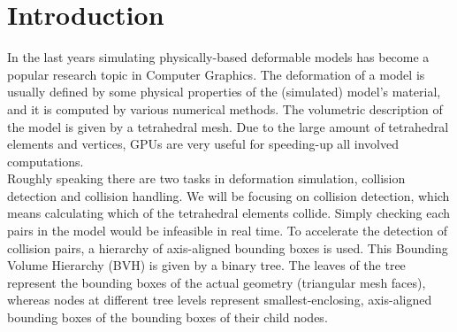 \section{Introduction}
In the last years simulating physically-based deformable models has become a popular research topic in Computer Graphics. The deformation of a model is usually defined by some physical properties of the (simulated) model’s material, and it is computed by various numerical methods. The volumetric description of the model is given by a tetrahedral mesh. Due to the large amount of tetrahedral elements and vertices, GPUs are very useful for speeding-up all involved computations.\\
Roughly speaking there are two tasks in deformation simulation, collision detection and collision handling. We will be focusing on collision detection, which means calculating which of the tetrahedral elements collide. Simply checking each pairs in the model would be infeasible in real time. To accelerate the detection of collision pairs, a hierarchy of axis-aligned bounding boxes is used. This Bounding Volume Hierarchy (BVH) is given by a binary tree. The leaves of the tree represent the bounding boxes of the actual geometry (triangular mesh faces), whereas nodes at different tree levels represent smallest-enclosing, axis-aligned bounding boxes of the bounding boxes of their child nodes.\\


